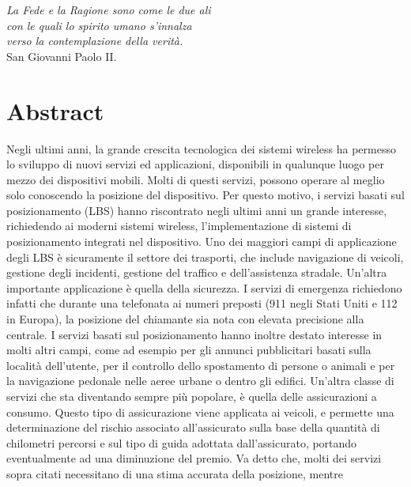 \thispagestyle{empty}
\vspace*{15ex}
\begin{flushright}
\textit{La Fede e la Ragione sono come le due ali \\
con le quali lo spirito umano s'innalza \\
verso la contemplazione della verit\`a.\\}
\vspace{4ex}
\scriptsize{San Giovanni Paolo II.}
\end{flushright}
\cleardoublepage

\chapter*{Abstract}
\label{chap:abstract}
\glsresetall
Negli ultimi anni, la grande crescita tecnologica dei sistemi wireless ha permesso lo sviluppo di nuovi
servizi ed applicazioni, disponibili in qualunque luogo per mezzo dei dispositivi mobili.
Molti di questi servizi, possono operare al meglio solo conoscendo la posizione del dispositivo.
Per questo motivo, i servizi basati sul posizionamento (LBS) hanno riscontrato negli ultimi anni un 
grande interesse, richiedendo ai moderni sistemi wireless, l'implementazione di sistemi di posizionamento
integrati nel dispositivo. 
Uno dei maggiori campi di applicazione degli LBS \`e sicuramente il settore dei trasporti, che include 
navigazione di veicoli, gestione degli incidenti, gestione del traffico e dell'assistenza stradale.
Un'altra importante applicazione \`e quella della sicurezza. I servizi di emergenza richiedono infatti 
che durante una telefonata ai numeri preposti (911 negli Stati Uniti e 112 in Europa),
la posizione del chiamante sia nota con elevata precisione alla centrale.
I servizi basati sul posizionamento hanno inoltre destato interesse in molti altri campi, 
come ad esempio per gli annunci pubblicitari basati sulla localit\`a dell'utente, per il controllo 
dello spostamento di persone o animali e per la navigazione pedonale nelle aeree urbane o dentro gli edifici.
Un'altra classe di servizi che sta diventando sempre pi\`u popolare, \`e quella delle assicurazioni a consumo.
Questo tipo di assicurazione viene applicata ai veicoli, e permette una determinazione del rischio
associato all'assicurato sulla base della quantit\`a di chilometri percorsi
e sul tipo di guida adottata dall'assicurato, portando eventualmente ad una diminuzione del premio.
Va detto che, molti dei servizi sopra citati necessitano di una stima accurata della posizione, mentre 

